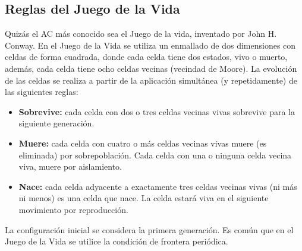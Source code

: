 \subsection{Reglas del Juego de la Vida}
\label{section:reglas}

Quizás el AC más conocido sea el Juego de la vida, inventado por John H. Conway. En el Juego de la Vida se utiliza un enmallado de dos dimensiones con celdas de forma cuadrada, donde cada celda tiene dos estados, vivo o muerto, además, cada celda tiene ocho celdas vecinas (vecindad de Moore). La evolución de las celdas se realiza a partir de la aplicación simultánea (y repetidamente) de las siguientes reglas: \cite{ilachinski2001cellular} \cite{gardner1970mathematical}

\begin{itemize}
  \item \textbf{Sobrevive:} cada celda con dos o tres celdas vecinas vivas sobrevive para la siguiente generación.
  \item \textbf{Muere:} cada celda con cuatro o más celdas vecinas vivas muere (es eliminada) por sobrepoblación. Cada celda con una o ninguna celda vecina viva, muere por aislamiento.
  \item \textbf{Nace:} cada celda adyacente a exactamente tres celdas vecinas vivas (ni más ni menos) es una celda que nace. La celda estará viva en el siguiente movimiento por reproducción.
\end{itemize}

La configuración inicial se considera la primera generación. Es común que en el Juego de la Vida se utilice la condición de frontera periódica. \cite{schiff2007cellular}